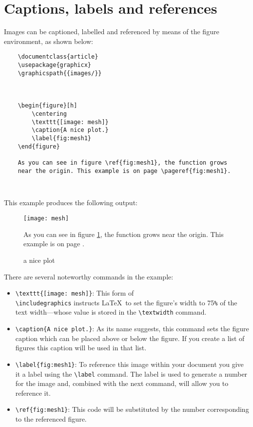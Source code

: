 \section{Captions, labels and references}

Images can be captioned, labelled and referenced by means of the figure environment, as shown below:

\begin{tcolorbox}
\begin{verbatim}
    \documentclass{article}
    \usepackage{graphicx}
    \graphicspath{{images/}}
 
    

    \begin{figure}[h]
        \centering
        \texttt{[image: mesh]}
        \caption{A nice plot.}
        \label{fig:mesh1}
    \end{figure}
 
    As you can see in figure \ref{fig:mesh1}, the function grows 
    near the origin. This example is on page \pageref{fig:mesh1}.

    
\end{verbatim}
\end{tcolorbox}

This example produces the following output:

\begin{figure}[h]
\begin{mdframed}
    \begin{Center}
        \texttt{[image: mesh]}
        \caption{a nice plot}
        \label{fig:mesh1}
    \end{Center}

    \-\hspace{20pt}As you can see in figure \ref{fig:mesh1}, the function grows near the origin. This example is on page \pageref{fig:mesh1}.
\end{mdframed}
\end{figure}

There are several noteworthy commands in the example:

\begin{itemize}
    \item \verb|\texttt{[image: mesh]}|: This form of \\\verb|\includegraphics| instructs \LaTeX\ to set the figure’s width to 75\verb|%| of the text width—whose value is stored in the \verb|\textwidth| command.
    \item \verb|\caption{A nice plot.}|: As its name suggests, this command sets the figure caption which can be placed above or below the figure. If you create a list of figures this caption will be used in that list.
    \item \verb|\label{fig:mesh1}|: To reference this image within your document you give it a label using the \verb|\label| command. The label is used to generate a number for the image and, combined with the next command, will allow you to reference it.
    \item \verb|\ref{fig:mesh1}|: This code will be substituted by the number corresponding to the referenced figure.
\end{itemize}

